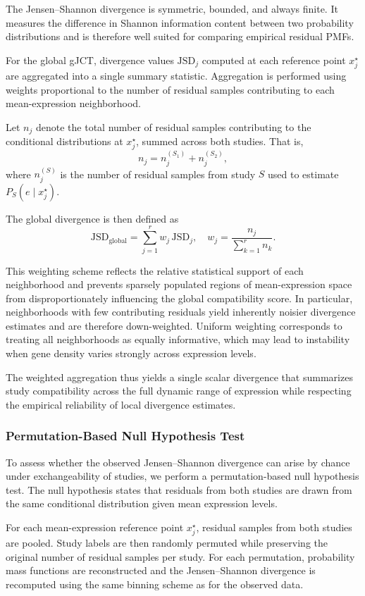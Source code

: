 The Jensen--Shannon divergence is symmetric, bounded, and always finite. It measures the difference in Shannon information content between two probability distributions and is therefore well suited for comparing empirical residual PMFs.

For the global gJCT, divergence values $\mathrm{JSD}_j$ computed at each reference point $x^\star_j$ are aggregated into a single summary statistic. Aggregation is performed using weights proportional to the number of residual samples contributing to each mean-expression neighborhood. 

Let $n_j$ denote the total number of residual samples contributing to the conditional distributions at $x^\star_j$, summed across both studies. That is,
\[
n_j = n^{(S_1)}_j + n^{(S_2)}_j,
\]
where $n^{(S)}_j$ is the number of residual samples from study $S$ used to estimate $P_S(e \mid x^\star_j)$.

The global divergence is then defined as
\[
\mathrm{JSD}_{\mathrm{global}} = \sum_{j=1}^{r} w_j \, \mathrm{JSD}_j,
\quad
w_j = \frac{n_j}{\sum_{k=1}^{r} n_k}.
\]

This weighting scheme reflects the relative statistical support of each neighborhood and prevents sparsely populated regions of mean-expression space from disproportionately influencing the global compatibility score. In particular, neighborhoods with few contributing residuals yield inherently noisier divergence estimates and are therefore down-weighted. Uniform weighting corresponds to treating all neighborhoods as equally informative, which may lead to instability when gene density varies strongly across expression levels.

The weighted aggregation thus yields a single scalar divergence that summarizes study compatibility across the full dynamic range of expression while respecting the empirical reliability of local divergence estimates.

\subsubsection{Permutation-Based Null Hypothesis Test}

To assess whether the observed Jensen--Shannon divergence can arise by chance under exchangeability of studies, we perform a permutation-based null hypothesis test. The null hypothesis states that residuals from both studies are drawn from the same conditional distribution given mean expression levels.

For each mean-expression reference point $x^\star_j$, residual samples from both studies are pooled. Study labels are then randomly permuted while preserving the original number of residual samples per study. For each permutation, probability mass functions are reconstructed and the Jensen--Shannon divergence is recomputed using the same binning scheme as for the observed data.

